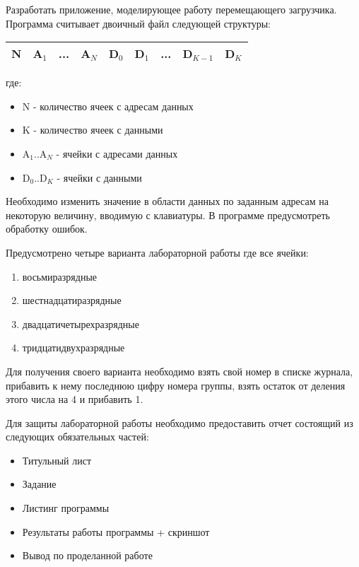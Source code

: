 \documentclass[a4paper,12pt]{article}
\begin{document}
  
  \begin{flushleft}
    Разработать приложение, моделирующее работу перемещающего загрузчика. Программа считывает двоичный файл следующей структуры:
    
    \begin{center}
      \begin{tabular}{|c|c|c|c|c|c|c|c|c|}
        \hline
        N & A$_{1}$ & ... & A$_{N}$ & D$_{0}$ & D$_{1}$ & ... & D$_{K-1}$ & D$_{K}$ \\
        \hline
      \end{tabular}
    \end{center}
    
    где:
    \begin{itemize}
      \item N - количество ячеек с адресам данных
      \item K - количество ячеек с данными
      \item A$_{1}$..A$_{N}$ - ячейки с адресами данных
      \item D$_{0}$..D$_{K}$ - ячейки с данными
    \end{itemize}
    
    Необходимо изменить значение в области данных по заданным адресам на некоторую величину, вводимую с клавиатуры. В программе предусмотреть обработку ошибок. \linebreak
    
    Предусмотрено четыре варианта лабораторной работы где все ячейки:
    \begin{enumerate}
      \item восьмиразрядные
      \item шестнадцатиразрядные
      \item двадцатичетырехразрядные
      \item тридцатидвухразрядные
    \end{enumerate}
    
    Для получения своего варианта необходимо взять свой номер в списке журнала, прибавить к нему последнюю цифру номера группы, взять остаток от деления этого числа на 4 и прибавить 1. \linebreak
    
    Для защиты лабораторной работы необходимо предоставить отчет состоящий из следующих обязательных частей:
    \begin{itemize}
      \item Титульный лист
      \item Задание
      \item Листинг программы
      \item Результаты работы программы + скриншот
      \item Вывод по проделанной работе
    \end{itemize}
    

\end{flushleft}
\end{document}
